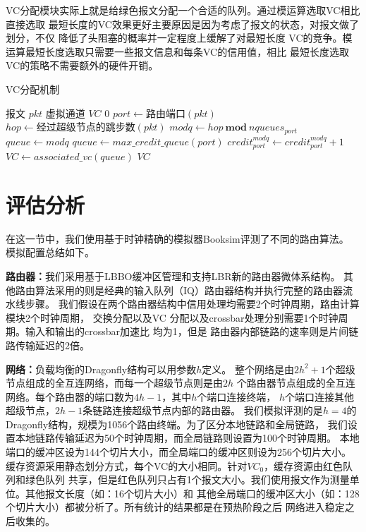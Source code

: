 VC分配模块实际上就是给绿色报文分配一个合适的队列。通过模运算选取VC相比直接选取
最短长度的VC效果更好主要原因是因为考虑了报文的状态，对报文做了划分，不仅
降低了头阻塞的概率并一定程度上缓解了对最短长度
VC的竞争。模运算最短长度选取只需要一些报文信息和每条VC的信用值，相比
最短长度选取VC的策略不需要额外的硬件开销。

\begin{algorithm}[t]
  \centering
  \caption{VC分配机制}
  \label{algo:va}
  \begin{algorithmic}[1]
    \REQUIRE 报文 $pkt$
    \ENSURE 虚拟通道  $VC$
    \RETURN $0$
    \ENDIF
    \STATE $port \leftarrow 路由端口(pkt)$
    \STATE $hop \leftarrow 经过超级节点的跳步数(pkt)$
    \STATE $modq \leftarrow hop\ \textbf{mod}\ nqueues_{port}$
    \STATE $queue \leftarrow modq$
    \ELSE
    \STATE $queue \leftarrow max\_credit\_queue(port)$
    \ENDIF
    \STATE $credit_{port}^{modq} \leftarrow credit_{port}^{modq} + 1$
    \STATE $VC \leftarrow associated\_vc(queue)$
    \RETURN $VC$
  \end{algorithmic}
\end{algorithm}

\section{评估分析}

在这一节中，我们使用基于时钟精确的模拟器Booksim评测了不同的路由算法。
模拟配置总结如下。

\textbf{路由器：}我们采用基于LBBO缓冲区管理和支持LBR新的路由器微体系结构。
其他路由算法采用的则是经典的输入队列（IQ）路由器结构并执行完整的路由器流水线步骤。
我们假设在两个路由器结构中信用处理均需要2个时钟周期，路由计算模块2个时钟周期，
交换分配以及VC 分配以及crossbar处理分别需要1个时钟周期。输入和输出的crossbar加速比
均为1，但是 路由器内部链路的速率则是片间链路传输延迟的2倍。

\textbf{网络：}负载均衡的Dragonfly结构可以用参数$h$定义。
整个网络是由$2h^2+1$个超级节点组成的全互连网络，而每一个超级节点则是由$2h$
个路由器节点组成的全互连网络。每个路由器的端口数为$4h-1$，其中$h$个端口连接终端，
$h$个端口连接其他超级节点，$2h-1$条链路连接超级节点内部的路由器。
我们模拟评测的是$h=4$的Dragonfly结构，规模为1056个路由终端。为了区分本地链路和全局链路，
我们设置本地链路传输延迟为50个时钟周期，而全局链路则设置为100个时钟周期。
本地端口的缓冲区设为144个切片大小，而全局端口的缓冲区则设为256个切片大小。
缓存资源采用静态划分方式，每个VC的大小相同。针对$VC_0$，缓存资源由红色队列和绿色队列
共享，但是红色队列只占有1个报文大小。我们使用报文作为测量单位。其他报文长度（如：16个切片大小）和
其他全局端口的缓冲区大小（如：128个切片大小）都被分析了。所有统计的结果都是在预热阶段之后
网络进入稳定之后收集的。

